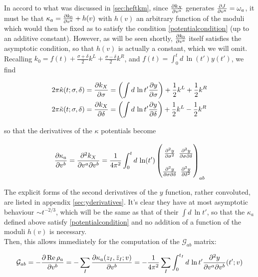In accord to what was discussed in \ref{sec:heftkm}, since $\frac{\partial k_X}{\partial v^a}$ generates $\frac{\partial J}{\partial v^a} = \omega_a$, it must be that $\kappa_a = \frac{\partial k_0}{\partial v^a} + h(v)$ with $h(v)$ an arbitrary function of the moduli which would then be fixed as to satisfy the condition \ref{potentialcondition} (up to an additive constant). However, as will be seen shortly, $\frac{\partial k_0}{\partial v^a}$ itself satisfies the asymptotic condition, so that $h(v)$ is actually a constant, which we will omit.\\

Recalling $k_0 = f(t) + \frac{\sigma+\delta}{2} k^L + \frac{\sigma-\delta}{2} k^R$, and $f(t) = \int_0^t d \, \ln(t') y(t')$, we find

\begin{align}
 	2\pi \hat\kappa(t;\sigma,\delta) =	\frac{\partial k_X}{\partial\sigma} & = \left( \int d\, \ln t' \frac{\partial y}{\partial\sigma} \right) + \frac{1}2 k^L + \frac{1}2 k^R \\
	2\pi \tilde\kappa(t;\sigma,\delta) =  \frac{\partial k_X}{\partial\delta} & = \left( \int d\, \ln t' \frac{\partial y}{\partial\delta} \right) + \frac{1}2 k^L - \frac{1}2 k^R
	\label{}
\end{align}

so that the derivatives of the $\kappa$ potentials become

\begin{equation}
\arraycolsep=1.4pt\def\arraystretch{2.2}
\pder{\kappa_a}{v^b} = \frac{\partial^2 k_X}{\partial v^a \partial v^b} = \frac{1}{4 \pi^2} \int_0^t d\, \ln(t')
	\begin{pmatrix}
		\frac{\partial^2 y}{\partial \sigma^2} & \frac{\partial^2 y}{\partial \sigma \partial \delta} \\
		\frac{\partial^2 y}{\partial \sigma\partial \delta} & \frac{\partial^2 y}{\partial \delta^2}
	\end{pmatrix}_{ab}
	\label{}
\end{equation}

The explicit forms of the second derivatives of the $y$ function, rather convoluted, are listed in appendix \ref{sec:yderivatives}. It's clear they have at most asymptotic behaviour $\sim t^{-2/3}$, which will be the same as that of their $\int d\,\ln t'$, so that the $\kappa_a$ defined above satisfy \ref{potentialcondition} and no addition of a function of the moduli $h(v)$ is necessary.\\

Then, this allows immediately for the computation of the $\mathcal{G}_{ab}$ matrix:

\begin{equation}
	\mathcal{G}_{ab} = - \frac{\partial\operatorname{Re} \rho_a}{\partial v^b}  = - \sum_I \frac{\partial \kappa_a(z_I,\bar z_I; v)}{\partial v^b} = - \frac{1}{4\pi^2} \sum_I \int_0^{t_I} d\,\ln t' \frac{\partial^2 y}{\partial v^a \partial v^b} (t' ; v)
	\label{}
\end{equation}

